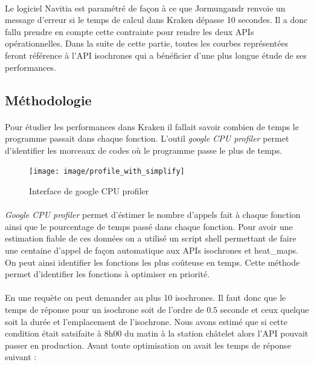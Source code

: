 \documentclass[a4paper]{report}
\begin{document}
\paragraph{}Le logiciel Navitia est paramétré de façon à ce que Jormungandr renvoie un message d'erreur si le temps de calcul dans Kraken dépasse 10 secondes. Il a donc fallu prendre en compte cette contrainte pour rendre les deux APIs opérationnelles. Dans la suite de cette partie, toutes les courbes représentées feront référence à l'API isochrones qui a bénéficier d'une plus longue étude de ses performances.

\subsection{Méthodologie}

\paragraph{} Pour étudier les performances dans Kraken il fallait savoir combien de temps le programme passait dans chaque fonction. L'outil \emph{google CPU profiler} permet d'identifier les morceaux de codes où le programme passe le plus de temps. 

\begin{figure}[H]
	\begin{center}
		\texttt{[image: image/profile\_with\_simplify]}
		\caption{Interface de google CPU profiler}
		\label{Interface de google CPU profiler}
	\end{center}
\end{figure}

\paragraph{} \emph{Google CPU profiler} permet d'éstimer le nombre d'appels fait à chaque fonction ainsi que le pourcentage de temps passé dans chaque fonction. Pour avoir une estimation fiable de ces données on a utilisé un script shell permettant de faire une centaine d'appel de façon automatique aux APIs isochrones et heat\_maps. On peut ainsi identifier les fonctions les plus coûteuse en temps. Cette méthode permet d'identifier les fonctions à optimiser en priorité. 

\paragraph{} En une requète on peut demander au plus 10 isochrones. Il faut donc que le temps de réponse pour un isochrone soit de l'ordre de $0.5$ seconde et ceux quelque soit la durée et l'emplacement de l'isochrone. Nous avons estimé que si cette condition était satsifaite à 8h00 du matin à la station châtelet alors l'API pouvait passer en production. Avant toute optimisation on avait les temps de réponse suivant :
\end{document}
